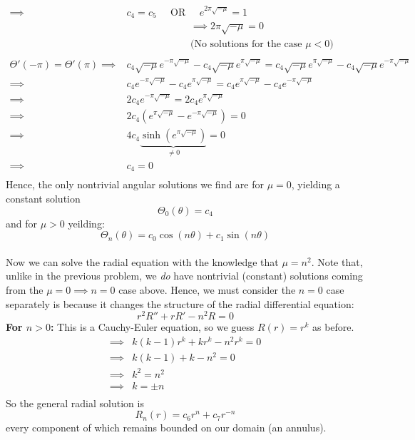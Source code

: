 \documentclass[12pt]{article}
\begin{document}
{\begin{align*}
\implies& \boxed{c_4 = c_5} \;\;\;\;\; \text{OR} \;\;\;\;\; e^{2\pi \sqrt{-\mu}} = 1  \\
& \;\;\;\;\;\;\;\;\;\;\;\;\;\;\;\;\;\;\;\;\;\;\; \implies  2 \pi \sqrt{-\mu} = 0  \\ 
& \;\;\;\;\;\;\;\;\;\;\;\;\;\;\;\;\;\;\;\;\;\;\; \text{(No solutions for the case $\mu < 0$)}  \\ \\
\Theta'(-\pi) = \Theta'(\pi) \implies& c_4 \sqrt{-\mu} e^{-\pi \sqrt{-\mu}} - c_4 \sqrt{-\mu} e^{\pi \sqrt{-\mu}} = c_4 \sqrt{-\mu} e^{\pi \sqrt{-\mu}} - c_4 \sqrt{-\mu} e^{-\pi \sqrt{-\mu}} \\
\implies& c_4 e^{-\pi \sqrt{-\mu}} - c_4 e^{\pi \sqrt{-\mu}} = c_4 e^{\pi \sqrt{-\mu}} - c_4 e^{-\pi \sqrt{-\mu}} \\
\implies& 2 c_4 e^{-\pi \sqrt{-\mu}} = 2 c_4 e^{\pi \sqrt{-\mu}} \\
\implies& 2 c_4 \left(  e^{\pi \sqrt{-\mu}} - e^{-\pi \sqrt{-\mu}} \right) = 0  \\
\implies& 4 c_4 \underbrace{ \sinh \left( e^{\pi \sqrt{-\mu}} \right) }_{\neq 0} = 0  \\
\implies& \boxed{c_4 = 0} \\
\end{align*}
Hence, the only nontrivial angular solutions we find are for $\mu = 0$, yielding a constant solution $$\Theta_0(\theta) = c_4$$ and for $\mu > 0$ yeilding:
$$\Theta_n(\theta) = c_0 \cos (n \theta) + c_1 \sin (n \theta)$$ \\
Now we can solve the radial equation with the knowledge that $\mu = n^2$. Note that, unlike in the previous problem, we \textit{do} have nontrivial (constant) solutions coming from the $\mu = 0 \implies n = 0$ case above. Hence, we must consider the $n=0$ case separately is because it changes the structure of the radial differential equation:
$$r^2 R'' + r R' - n^2 R = 0$$
\textbf{For $n > 0$:} This is a Cauchy-Euler equation, so we guess $R(r) = r^k$ as before.
\begin{align*}
\implies& k(k - 1) r^k + k r^k - n^2 r^k = 0 \\
\implies& k(k - 1) + k - n^2 = 0 \\
\implies& k^2 =  n^2 \\
\implies& k =  \pm n \\
\end{align*}
So the general radial solution is $$R_n(r) = c_6 r^{n} + c_7 r^{-n}$$ every component of which remains bounded on our domain (an annulus).  \\ \\
}
\end{document}
